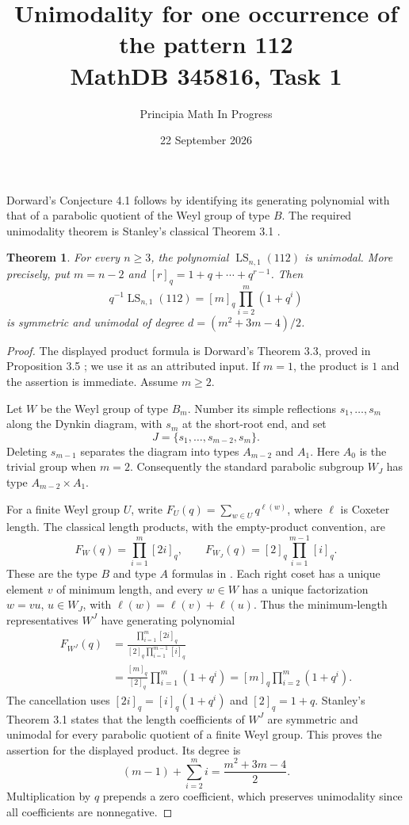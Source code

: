 \documentclass[11pt]{article}
\title{Unimodality for one occurrence of the pattern 112\\\large MathDB 345816, Task 1}
\author{Principia Math In Progress}
\date{22 September 2026}
\newtheorem{theorem}{Theorem}
\begin{document}
\maketitle
\noindent Dorward's Conjecture 4.1 \cite{D} follows by identifying its generating
polynomial with that of a parabolic quotient of the Weyl group of type $B$.
The required unimodality theorem is Stanley's classical Theorem 3.1 \cite{S}.

\begin{theorem}
For every $n\geq3$, the polynomial $\operatorname{LS}_{n,1}(112)$ is unimodal.
More precisely, put $m=n-2$ and $[r]_q=1+q+\cdots+q^{r-1}$. Then
\[
 q^{-1}\operatorname{LS}_{n,1}(112)
 =[m]_q\prod_{i=2}^m(1+q^i)
\]
is symmetric and unimodal of degree $d=(m^2+3m-4)/2$.
\end{theorem}
\begin{proof}
The displayed product formula is Dorward's Theorem 3.3, proved in
Proposition 3.5 \cite{D}; we use it as an attributed input. If $m=1$,
the product is $1$ and the assertion is immediate. Assume $m\geq2$.

Let $W$ be the Weyl group of type $B_m$. Number its simple reflections
$s_1,\ldots,s_m$ along the Dynkin diagram, with $s_m$ at the short-root
end, and set
\[
 J=\{s_1,\ldots,s_{m-2},s_m\}.
\]
Deleting $s_{m-1}$ separates the diagram into types $A_{m-2}$ and $A_1$.
Here $A_0$ is the trivial group when $m=2$.
Consequently the standard parabolic subgroup $W_J$ has type
$A_{m-2}\times A_1$.

For a finite Weyl group $U$, write $F_U(q)=\sum_{w\in U}q^{\ell(w)}$,
where $\ell$ is Coxeter length. The classical length products, with the
empty-product convention, are
\[
 F_W(q)=\prod_{i=1}^m[2i]_q,\qquad
 F_{W_J}(q)=[2]_q\prod_{i=1}^{m-1}[i]_q.
\]
These are the type $B$ and type $A$ formulas in \cite[\S\S3--5]{S}.
Each right coset has a unique element $v$ of minimum length, and every
$w\in W$ has a unique factorization $w=vu$, $u\in W_J$, with
$\ell(w)=\ell(v)+\ell(u)$. Thus the minimum-length representatives
$W^J$ have generating polynomial
\begin{align*}
 F_{W^J}(q)
 &=\frac{\prod_{i=1}^m[2i]_q}
 {[2]_q\prod_{i=1}^{m-1}[i]_q}\\
 &=\frac{[m]_q}{[2]_q}\prod_{i=1}^m(1+q^i)
 =[m]_q\prod_{i=2}^m(1+q^i).
\end{align*}
The cancellation uses $[2i]_q=[i]_q(1+q^i)$ and $[2]_q=1+q$.
Stanley's Theorem 3.1 states that the length coefficients of $W^J$ are
symmetric and unimodal for every parabolic quotient of a finite Weyl
group. This proves the assertion for the displayed product. Its degree is
\[
 (m-1)+\sum_{i=2}^m i=\frac{m^2+3m-4}{2}.
\]
Multiplication by $q$ prepends a zero coefficient, which preserves
unimodality since all coefficients are nonnegative.
\end{proof}
\end{document}
